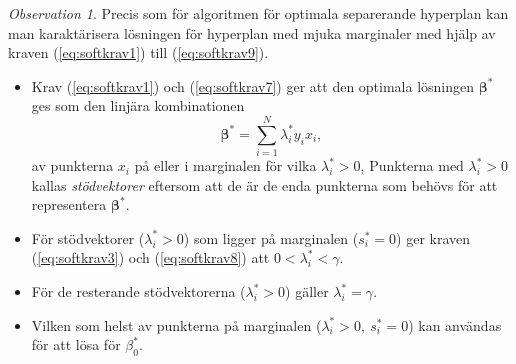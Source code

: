 \documentclass[a4paper, 12pt]{report}
\theoremstyle{definition}
\theoremstyle{remark}
\newtheorem*{rem}{Observation}
\newcommand{\bfbeta}{{\boldsymbol{\beta}}}
\begin{document}
\begin{rem}
	Precis som för algoritmen för optimala separerande hyperplan kan man karaktärisera lösningen för hyperplan med mjuka marginaler med hjälp av kraven (\ref{eq:softkrav1}) till (\ref{eq:softkrav9}).
	\begin{itemize}
		\item Krav (\ref{eq:softkrav1}) och (\ref{eq:softkrav7}) ger att den optimala lösningen $\bfbeta^*$ ges som den linjära kombinationen
		\begin{equation*}
			\bfbeta^* = \sum_{i=1}^{N}\lambda_i^*y_ix_i,
		\end{equation*}
		av punkterna $x_i$ på eller i marginalen för vilka $\lambda_i^*>0$, Punkterna med $\lambda^*_i>0$ kallas \emph{stödvektorer} eftersom att de är de enda punkterna som behövs för att representera $\bfbeta^*$.
		\item För stödvektorer ($\lambda^*_i>0$) som ligger på marginalen ($s_i^*=0$) ger kraven (\ref{eq:softkrav3}) och (\ref{eq:softkrav8}) att $0<\lambda_i^*<\gamma$.
		\item För de resterande stödvektorerna ($\lambda_i^*>0$) gäller $\lambda_i^*=\gamma$.
		\item Vilken som helst av punkterna på marginalen ($\lambda^*_i>0,~s^*_i=0$) kan användas för att lösa för $\beta_0^*$.
	\end{itemize}
\end{rem}
\end{document}
